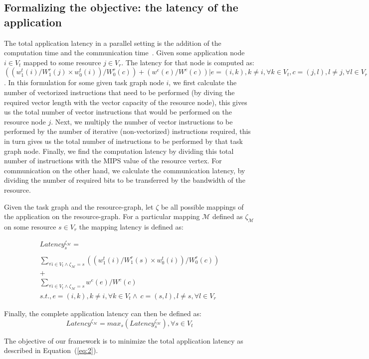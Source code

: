 \subsection{Formalizing the objective: the latency of the application}
\label{sec:form-latency-appl}

The total application latency in a parallel setting is the addition of
the computation time and the communication
time~\cite{ssan05,ajai04}. Given some application node $i \in V_t$
mapped to some resource $j \in V_r$. The latency for that node is
computed as: $((w^t_1(i)/W^r_1(j)\times w^t_0(i))/W^r_0(c))+
(w^e(e)/W^c(c)) | e = (i,k), k \neq i, \forall k \in V_t, c = (j,l), l
\neq j, \forall l \in V_r $. In this formulation for some given
task graph node $i$, we first calculate the number of vectorized
instructions that need to be performed (by diving the required vector
length with the vector capacity of the resource node), this gives us the
total number of vector instructions that would be performed on the
resource node $j$. Next, we multiply the number of vector instructions
to be performed by the number of iterative (non-vectorized) instructions
required, this in turn gives us the total number of instructions to be
performed by that task graph node. Finally, we find the computation
latency by dividing this total number of instructions with the MIPS
value of the resource vertex. For communication on the other hand, we
calculate the communication latency, by dividing the number of required
bits to be transferred by the bandwidth of the resource.

Given the task graph and the resource-graph, let $\zeta$ be all possible
mappings of the application on the resource-graph. For a particular
mapping $\mathcal{M}$ defined as $\zeta_\mathcal{M}$ on some resource $s
\in V_r$ the mapping latency is defined as:

\begin{equation}
  \begin{array}{c}
    Latency^{\zeta_\mathcal{M}}_s = \\
    \\
    \sum_{\forall i \in V_t \wedge
      \zeta_\mathcal{M} = s} ((w^t_1(i)/W^r_1(s)\times w^t_0(i))/W^r_0(c))
    \\
    +
    \\
    \sum_{\forall i \in V_t \wedge
      \zeta_\mathcal{M} = s} w^e(e) / W^c(c)\\ 
    s.t., e = (i,k), k \neq i, \forall k
    \in V_t \wedge\  c = (s,l), l \neq s, \forall l \in V_r
  \end{array}
  \label{eq:1}
\end{equation}

Finally, the complete application latency can then be defined as: 
\begin{equation}
  \tag{OBJECTIVE\_FUNCTION}
  \label{eq:2}
  Latency^{\zeta_\mathcal{M}} = max_{s}
  ({Latency^{\zeta_\mathcal{M}}_s}), \forall s \in V_t
\end{equation}

The objective of our framework is to minimize the total application
latency as described in Equation~(\ref{eq:2}).

